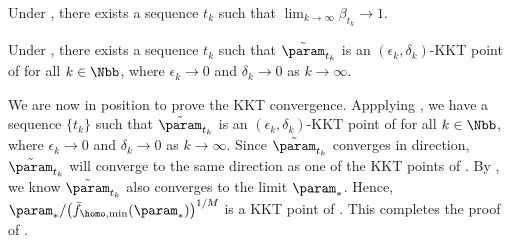 \begin{lemma}
    \label{lem: beta goes to 1gd}
    Under ,  there exists a sequence $t_k$ such that $\lim_{k\to \infty}\beta_{t_k} \to 1$.
\end{lemma}
\begin{lemma}
    \label{lem: approx kkTgd}
    Under , there exists a sequence $t_k$ such that $\tilde \param_{t_k}$ is an $(\epsilon_k, \delta_k)$-KKT point of  for all $k\in \Nbb$, where $\epsilon_k \to 0$ and $\delta_k \to 0$ as $k\to \infty$.
\end{lemma}
We are now in position to prove the KKT convergence. Appplying , we have a sequence $\{t_k\}$ such that $\tilde \param_{t_k}$ is an $(\epsilon_k, \delta_k)$-KKT point of  for all $k\in \Nbb$, where $\epsilon_k \to 0$ and $\delta_k \to 0$ as $k\to \infty$. Since $\tilde{\param}_{t_k}$ converges in direction, $\tilde{\param}_{t_k}$ will converge to the same direction as one of the KKT points of .  By , we know $\tilde{\param}_{t_k}$ also converges to the limit $\param_*$. Hence, $\param_*/\big(\bar f_{\homo,\min}(\param _*)\big)^{1/M}$ is a KKT point of . This completes the proof of . 


